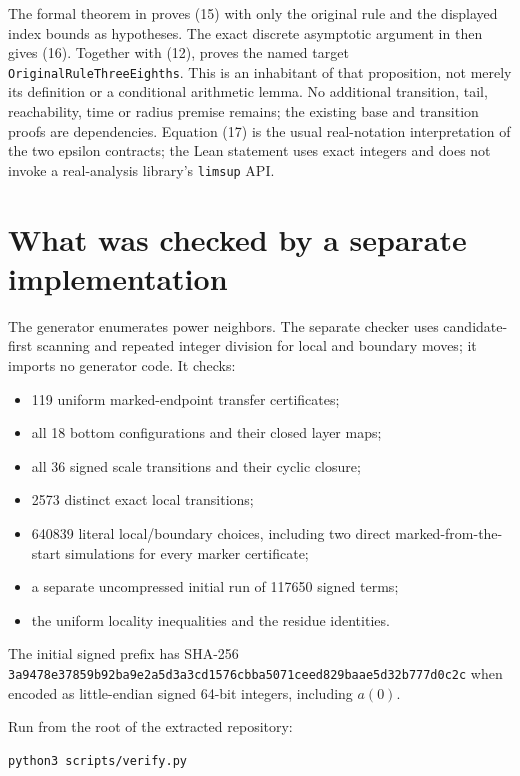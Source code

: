 \documentclass[11pt,a4paper]{article}
\begin{document}
The formal theorem  in
 proves (15) with only
the original rule and the displayed index bounds as hypotheses. The
exact discrete asymptotic argument in
 then gives (16).
Together with (12),  proves the named
target \texttt{OriginalRuleThreeEighths}. This is an inhabitant of that
proposition, not merely its definition or a conditional arithmetic lemma.
No additional transition, tail, reachability, time or radius premise
remains; the existing base and transition proofs are dependencies.
Equation (17) is the usual real-notation interpretation of the two
epsilon contracts; the Lean statement uses exact integers and does not
invoke a real-analysis library's \texttt{limsup} API.

\section{What was checked by a separate implementation}
\label{sec:9}

The generator enumerates power neighbors. The separate checker uses candidate-first scanning and repeated integer division for local and boundary moves; it imports no generator code. It checks:

\begin{itemize}
\item 119 uniform marked-endpoint transfer certificates;
\item all 18 bottom configurations and their closed layer maps;
\item all 36 signed scale transitions and their cyclic closure;
\item 2573 distinct exact local transitions;
\item 640839 literal local/boundary choices, including two direct marked-from-the-start simulations for every marker certificate;
\item a separate uncompressed initial run of 117650 signed terms;
\item the uniform locality inequalities and the residue identities.
\end{itemize}

The initial signed prefix has SHA-256 \nolinkurl{3a9478e37859b92ba9e2a5d3a3cd1576cbba5071ceed829baae5d32b777d0c2c} when encoded as little-endian signed 64-bit integers, including $a(0)$.

\begin{samepage}
Run from the root of the extracted repository:

\begin{verbatim}
python3 scripts/verify.py
\end{verbatim}
\end{samepage}
\end{document}
